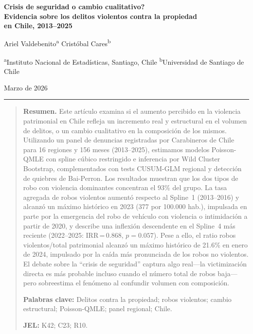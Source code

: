 \documentclass[12pt,a4paper]{article}
\begin{document}

\thispagestyle{plain}

\begin{center}
{\Large\bfseries \textquestiondown Crisis de seguridad o cambio cualitativo?\\[6pt]
Evidencia sobre los delitos violentos contra la propiedad\\[6pt]
en Chile, 2013--2025}

\vspace{18pt}
{\normalsize Ariel Valdebenito\textsuperscript{a} \quad Crist\'obal Cares\textsuperscript{b}}

\vspace{6pt}
{\small \textsuperscript{a}Instituto Nacional de Estad\'isticas, Santiago, Chile \quad
\textsuperscript{b}Universidad de Santiago de Chile}

\vspace{6pt}
{\small Marzo de 2026}
\end{center}

\vspace{12pt}
\noindent\rule{\linewidth}{0.5pt}
\vspace{4pt}

\begin{quote}
\small\noindent\textbf{Resumen.} Este art\'iculo examina si el aumento percibido en la violencia
patrimonial en Chile refleja un incremento real y estructural en el volumen de delitos,
o un cambio cualitativo en la composici\'on de los mismos. Utilizando un panel de
denuncias registradas por Carabineros de Chile para 16 regiones y 156 meses (2013--2025),
estimamos modelos Poisson-QMLE con spline c\'ubico restringido e inferencia por Wild
Cluster Bootstrap, complementados con tests CUSUM-GLM regional y detecci\'on de
quiebres de Bai-Perron. Los resultados muestran que los dos tipos de robo con violencia
dominantes concentran el 93\% del grupo. La tasa agregada de robos violentos aument\'o
respecto al Spline~1 (2013--2016) y alcanz\'o un m\'aximo hist\'orico en 2023
(377 por 100.000 hab.), impulsada en parte por la emergencia del robo de veh\'iculo
con violencia o intimidaci\'on a partir de 2020, y describe una inflexi\'on descendente
en el Spline~4 m\'as reciente (2022--2025: IRR\,=\,0.868, $p=0.057$). Pese a ello, el ratio robos violentos/total patrimonial
alcanz\'o un m\'aximo hist\'orico de 21.6\% en enero de 2024, impulsado por la ca\'ida
m\'as pronunciada de los robos no violentos. El debate sobre la ``crisis de seguridad''
captura algo real---la victimizaci\'on directa es m\'as probable incluso cuando el
n\'umero total de robos baja---pero sobreestima el fen\'omeno al confundir volumen con
composici\'on.

\vspace{6pt}
\noindent\textbf{Palabras clave:} Delitos contra la propiedad; robos violentos; cambio
estructural; Poisson-QMLE; panel regional; Chile.

\noindent\textbf{JEL:} K42; C23; R10.
\end{quote}
\end{document}
